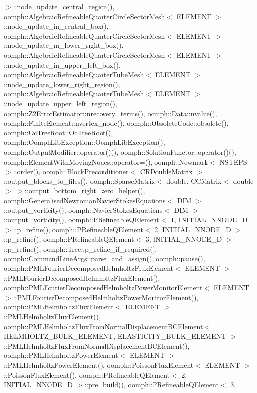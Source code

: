 $>$\+::node\+\_\+update\+\_\+central\+\_\+region(), oomph\+::\+Algebraic\+Refineable\+Quarter\+Circle\+Sector\+Mesh$<$ E\+L\+E\+M\+E\+N\+T $>$\+::node\+\_\+update\+\_\+in\+\_\+central\+\_\+box(), oomph\+::\+Algebraic\+Refineable\+Quarter\+Circle\+Sector\+Mesh$<$ E\+L\+E\+M\+E\+N\+T $>$\+::node\+\_\+update\+\_\+in\+\_\+lower\+\_\+right\+\_\+box(), oomph\+::\+Algebraic\+Refineable\+Quarter\+Circle\+Sector\+Mesh$<$ E\+L\+E\+M\+E\+N\+T $>$\+::node\+\_\+update\+\_\+in\+\_\+upper\+\_\+left\+\_\+box(), oomph\+::\+Algebraic\+Refineable\+Quarter\+Tube\+Mesh$<$ E\+L\+E\+M\+E\+N\+T $>$\+::node\+\_\+update\+\_\+lower\+\_\+right\+\_\+region(), oomph\+::\+Algebraic\+Refineable\+Quarter\+Tube\+Mesh$<$ E\+L\+E\+M\+E\+N\+T $>$\+::node\+\_\+update\+\_\+upper\+\_\+left\+\_\+region(), oomph\+::\+Z2\+Error\+Estimator\+::nrecovery\+\_\+terms(), oomph\+::\+Data\+::nvalue(), oomph\+::\+Finite\+Element\+::nvertex\+\_\+node(), oomph\+::\+Obsolete\+Code\+::obsolete(), oomph\+::\+Oc\+Tree\+Root\+::\+Oc\+Tree\+Root(), oomph\+::\+Oomph\+Lib\+Exception\+::\+Oomph\+Lib\+Exception(), oomph\+::\+Output\+Modifier\+::operator()(), oomph\+::\+Solution\+Functor\+::operator()(), oomph\+::\+Element\+With\+Moving\+Nodes\+::operator=(), oomph\+::\+Newmark$<$ N\+S\+T\+E\+P\+S $>$\+::order(), oomph\+::\+Block\+Preconditioner$<$ C\+R\+Double\+Matrix $>$\+::output\+\_\+blocks\+\_\+to\+\_\+files(), oomph\+::\+Sparse\+Matrix$<$ double, C\+C\+Matrix$<$ double $>$ $>$\+::output\+\_\+bottom\+\_\+right\+\_\+zero\+\_\+helper(), oomph\+::\+Generalised\+Newtonian\+Navier\+Stokes\+Equations$<$ D\+I\+M $>$\+::output\+\_\+vorticity(), oomph\+::\+Navier\+Stokes\+Equations$<$ D\+I\+M $>$\+::output\+\_\+vorticity(), oomph\+::\+P\+Refineable\+Q\+Element$<$ 1, I\+N\+I\+T\+I\+A\+L\+\_\+\+N\+N\+O\+D\+E\+\_\+D $>$\+::p\+\_\+refine(), oomph\+::\+P\+Refineable\+Q\+Element$<$ 2, I\+N\+I\+T\+I\+A\+L\+\_\+\+N\+N\+O\+D\+E\+\_\+D $>$\+::p\+\_\+refine(), oomph\+::\+P\+Refineable\+Q\+Element$<$ 3, I\+N\+I\+T\+I\+A\+L\+\_\+\+N\+N\+O\+D\+E\+\_\+D $>$\+::p\+\_\+refine(), oomph\+::\+Tree\+::p\+\_\+refine\+\_\+if\+\_\+required(), oomph\+::\+Command\+Line\+Args\+::parse\+\_\+and\+\_\+assign(), oomph\+::pause(), oomph\+::\+P\+M\+L\+Fourier\+Decomposed\+Helmholtz\+Flux\+Element$<$ E\+L\+E\+M\+E\+N\+T $>$\+::\+P\+M\+L\+Fourier\+Decomposed\+Helmholtz\+Flux\+Element(), oomph\+::\+P\+M\+L\+Fourier\+Decomposed\+Helmholtz\+Power\+Monitor\+Element$<$ E\+L\+E\+M\+E\+N\+T $>$\+::\+P\+M\+L\+Fourier\+Decomposed\+Helmholtz\+Power\+Monitor\+Element(), oomph\+::\+P\+M\+L\+Helmholtz\+Flux\+Element$<$ E\+L\+E\+M\+E\+N\+T $>$\+::\+P\+M\+L\+Helmholtz\+Flux\+Element(), oomph\+::\+P\+M\+L\+Helmholtz\+Flux\+From\+Normal\+Displacement\+B\+C\+Element$<$ H\+E\+L\+M\+H\+O\+L\+T\+Z\+\_\+\+B\+U\+L\+K\+\_\+\+E\+L\+E\+M\+E\+N\+T, E\+L\+A\+S\+T\+I\+C\+I\+T\+Y\+\_\+\+B\+U\+L\+K\+\_\+\+E\+L\+E\+M\+E\+N\+T $>$\+::\+P\+M\+L\+Helmholtz\+Flux\+From\+Normal\+Displacement\+B\+C\+Element(), oomph\+::\+P\+M\+L\+Helmholtz\+Power\+Element$<$ E\+L\+E\+M\+E\+N\+T $>$\+::\+P\+M\+L\+Helmholtz\+Power\+Element(), oomph\+::\+Poisson\+Flux\+Element$<$ E\+L\+E\+M\+E\+N\+T $>$\+::\+Poisson\+Flux\+Element(), oomph\+::\+P\+Refineable\+Q\+Element$<$ 2, I\+N\+I\+T\+I\+A\+L\+\_\+\+N\+N\+O\+D\+E\+\_\+D $>$\+::pre\+\_\+build(), oomph\+::\+P\+Refineable\+Q\+Element$<$ 3, 
